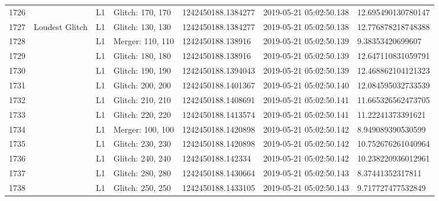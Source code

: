 \begin{longtable}{lllllll}
1726 &                                                    &       L1 &  Glitch: 170, 170 &  1242450188.1384277 &  2019-05-21 05:02:50.138 &  12.695490130780147 \\
1727 &                                     Loudest Glitch &       L1 &  Glitch: 130, 130 &  1242450188.1384277 &  2019-05-21 05:02:50.138 &  12.776878218748388 \\
1728 &                                                    &       L1 &  Merger: 110, 110 &   1242450188.138916 &  2019-05-21 05:02:50.139 &    9.38353420699607 \\
1729 &                                                    &       L1 &  Glitch: 180, 180 &   1242450188.138916 &  2019-05-21 05:02:50.139 &  12.647110831059791 \\
1730 &                                                    &       L1 &  Glitch: 190, 190 &  1242450188.1394043 &  2019-05-21 05:02:50.139 &  12.468862104121323 \\
1731 &                                                    &       L1 &  Glitch: 200, 200 &  1242450188.1401367 &  2019-05-21 05:02:50.140 &  12.084595032733539 \\
1732 &                                                    &       L1 &  Glitch: 210, 210 &  1242450188.1408691 &  2019-05-21 05:02:50.141 &  11.665326562473705 \\
1733 &                                                    &       L1 &  Glitch: 220, 220 &  1242450188.1413574 &  2019-05-21 05:02:50.141 &   11.22241373391621 \\
1734 &                                                    &       L1 &  Merger: 100, 100 &  1242450188.1420898 &  2019-05-21 05:02:50.142 &   8.949089390530599 \\
1735 &                                                    &       L1 &  Glitch: 230, 230 &  1242450188.1420898 &  2019-05-21 05:02:50.142 &  10.752676261040964 \\
1736 &                                                    &       L1 &  Glitch: 240, 240 &   1242450188.142334 &  2019-05-21 05:02:50.142 &  10.238220936012961 \\
1737 &                                                    &       L1 &  Glitch: 280, 280 &  1242450188.1430664 &  2019-05-21 05:02:50.143 &    8.37441352317811 \\
1738 &                                                    &       L1 &  Glitch: 250, 250 &  1242450188.1433105 &  2019-05-21 05:02:50.143 &   9.717727477532849 \\

\end{longtable}
